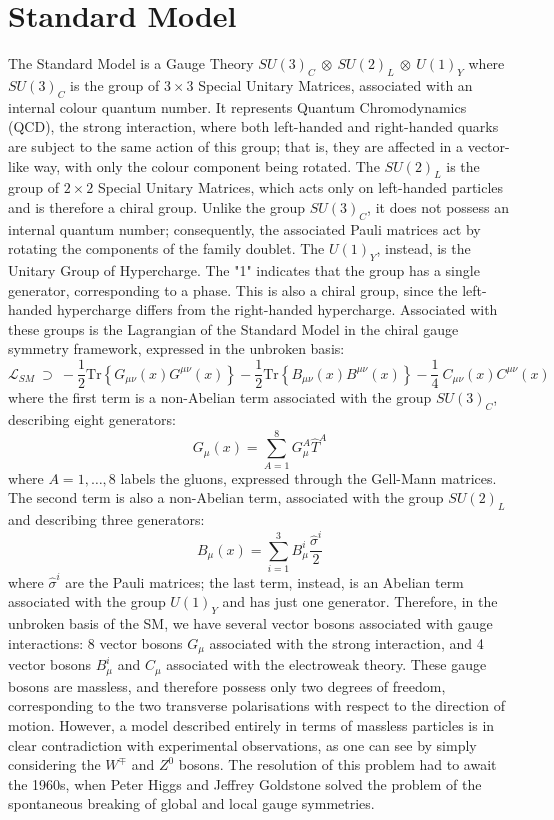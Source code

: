 \documentclass[11pt,a4paper,twoside,openright]{report}
\begin{document}
\section{Standard Model}

The Standard Model is a Gauge Theory \(SU(3)_C\ \otimes\ SU(2)_L\ \otimes\ U(1)_Y\) where \(SU(3)_C\) is the group of \(3\times3\) Special Unitary Matrices, associated with an internal colour quantum number. It represents Quantum Chromodynamics (QCD), the strong interaction, where both left-handed and right-handed quarks are subject to the same action of this group; that is, they are affected in a vector-like way, with only the colour component being rotated. The \(SU(2)_L\) is the group of \(2\times2\) Special Unitary Matrices, which acts only on left-handed particles and is therefore a chiral group. Unlike the group \(SU(3)_C\), it does not possess an internal quantum number; consequently, the associated Pauli matrices act by rotating the components of the family doublet. The \(U(1)_Y\), instead, is the Unitary Group of Hypercharge. The "1" indicates that the group has a single generator, corresponding to a phase. This is also a chiral group, since the left-handed hypercharge differs from the right-handed hypercharge. Associated with these groups is the Lagrangian of the Standard Model in the chiral gauge symmetry framework, expressed in the unbroken basis:
\begin{equation}
\mathcal{L}_{SM}\ \supset\ -\frac{1}{2}\mathrm{Tr}\left\{ G_{\mu\nu}(x)G^{\mu\nu}(x) \right\}-\frac{1}{2}\mathrm{Tr}\left\{ B_{\mu\nu}(x)B^{\mu\nu}(x) \right\}-\frac{1}{4}\ C_{\mu\nu}(x)C^{\mu\nu}(x)
\end{equation}
where the first term is a non-Abelian term associated with the group \(SU(3)_C\), describing eight generators:
\begin{equation}
G_\mu(x)=\sum_{A=1}^8 G_\mu^A \hat{T}^A
\end{equation}
where \(A=1,\dots,8\) labels the gluons, expressed through the Gell-Mann matrices. The second term is also a non-Abelian term, associated with the group \(SU(2)_L\) and describing three generators:
\begin{equation}
B_\mu(x)=\sum_{i=1}^3 B_\mu^i \frac{\hat{\sigma}^i}{2}
\end{equation}
where \(\hat{\sigma}^i\) are the Pauli matrices; the last term, instead, is an Abelian term associated with the group \(U(1)_Y\) and has just one generator. Therefore, in the unbroken basis of the SM, we have several vector bosons associated with gauge interactions: 8 vector bosons \(G_\mu\) associated with the strong interaction, and 4 vector bosons \(B_\mu^i\) and \(C_\mu\) associated with the electroweak theory. These gauge bosons are massless, and therefore possess only two degrees of freedom, corresponding to the two transverse polarisations with respect to the direction of motion. However, a model described entirely in terms of massless particles is in clear contradiction with experimental observations, as one can see by simply considering the \(W^{\mp}\) and \(Z^0\) bosons. The resolution of this problem had to await the 1960s, when Peter Higgs and Jeffrey Goldstone solved the problem of the spontaneous breaking of global and local gauge symmetries.
\end{document}
